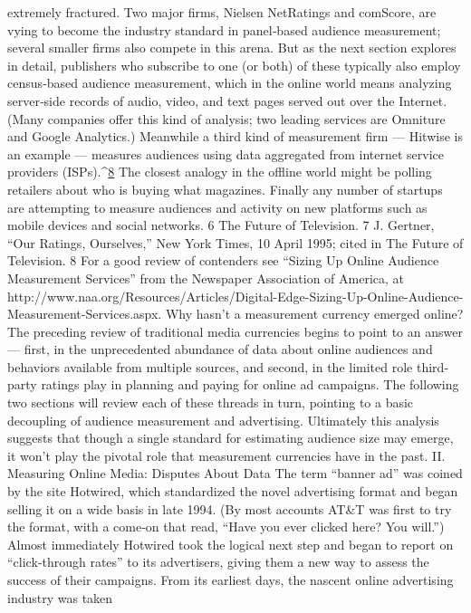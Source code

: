 extremely fractured. Two major firms, Nielsen NetRatings and comScore,
are vying to become the industry standard in panel‐based audience
measurement; several smaller firms also compete in this arena. But as the
next section explores in detail, publishers who subscribe to one (or both)
of these typically also employ census‐based audience measurement,
which in the online world means analyzing server‐side records of audio,
video, and text pages served out over the Internet. (Many companies offer
this kind of analysis; two leading services are Omniture and Google
Analytics.) Meanwhile a third kind of measurement firm — Hitwise is an
example — measures audiences using data aggregated from internet
service providers (ISPs).^{\href{#endnotes}{8}} The closest analogy in the offline world might be
polling retailers about who is buying what magazines. Finally any number
of startups are attempting to measure audiences and activity on new
platforms such as mobile devices and social networks.
6 The Future of Television.
7 J. Gertner, ``Our Ratings, Ourselves,'' New York Times, 10 April 1995; cited in The
Future of Television.
8 For a good review of contenders see ``Sizing Up Online Audience Measurement
Services'' from the Newspaper Association of America, at
http://www.naa.org/Resources/Articles/Digital-Edge-Sizing-Up-Online-Audience-
Measurement-Services.aspx.
Why hasn’t a measurement currency emerged online? The preceding
review of traditional media currencies begins to point to an answer —
first, in the unprecedented abundance of data about online audiences and
behaviors available from multiple sources, and second, in the limited role
third‐party ratings play in planning and paying for online ad campaigns.
The following two sections will review each of these threads in turn,
pointing to a basic decoupling of audience measurement and advertising.
Ultimately this analysis suggests that though a single standard for
estimating audience size may emerge, it won’t play the pivotal role that
measurement currencies have in the past.
II. Measuring Online Media: Disputes About Data
The term ``banner ad'' was coined by the site Hotwired, which
standardized the novel advertising format and began selling it on a wide
basis in late 1994. (By most accounts AT&T was first to try the format,
with a come‐on that read, ``Have you ever clicked here? You will.'')
Almost immediately Hotwired took the logical next step and began to
report on ``click‐through rates'' to its advertisers, giving them a new way
to assess the success of their campaigns.
From its earliest days, the nascent online advertising industry was taken
